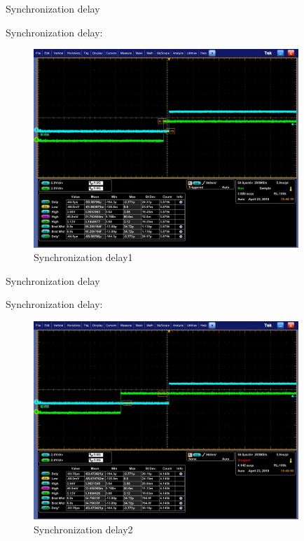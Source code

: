 \begin{frame}[fragile]{Synchronization delay}

Synchronization delay:

  \begin{figure}[htbp]
  \begin{center}
  \includegraphics[width=10cm]{img/mis1}
  \caption{Synchronization delay1}
  \label{report}
  \end{center}
  \vspace{-0.5em}
  \end{figure}


\end{frame}
\begin{frame}[fragile]{Synchronization delay}

Synchronization delay:

  \begin{figure}[htbp]
  \begin{center}
  \includegraphics[width=10cm]{img/mis2}
  \caption{Synchronization delay2}
  \label{report}
  \end{center}
  \vspace{-0.5em}
  \end{figure}


\end{frame}


